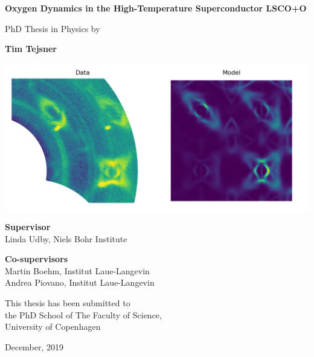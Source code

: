 \begin{titlingpage}
    \begin{center}
        \vspace*{1cm}
  
        {\huge \textbf{Oxygen Dynamics in the High-Temperature Superconductor LSCO+O}}
  
        \vspace{0.6cm}

        PhD Thesis in Physics by

        \vspace{0.6cm}
  
        \textbf{Tim Tejsner}
        
        \vfill

        \includegraphics[width=\textwidth]{fig/thesis_title.png}

        \vspace{4cm}

        \textbf{Supervisor}\\
        Linda Udby, Niels Bohr Institute
        
        \vspace{0.5cm}
        
        \textbf{Co-supervisors}\\
        Martin Boehm, Institut Laue-Langevin\\
        Andrea Piovano, Institut Laue-Langevin
  
        \vspace{1cm}
    
        This thesis has been submitted to \\
        the PhD School of The Faculty of Science, \\
        University of Copenhagen

        \vspace{1cm}

        December, 2019
        
    \end{center}
 \end{titlingpage}